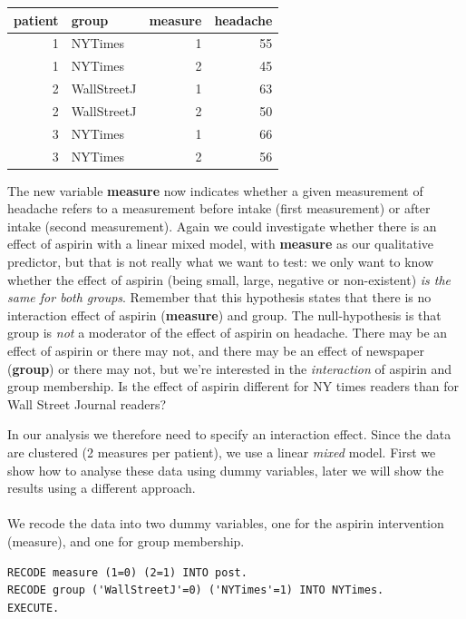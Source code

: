 \documentclass[]{report}\usepackage[]{graphicx}\usepackage[]{color}
\newenvironment{knitrout}{}{} %
\begin{document}
\begin{knitrout}
\color{fgcolor}
\begin{tabular}{r|l|r|r}
\hline
patient & group & measure & headache\\
\hline
1 & NYTimes & 1 & 55\\
\hline
1 & NYTimes & 2 & 45\\
\hline
2 & WallStreetJ & 1 & 63\\
\hline
2 & WallStreetJ & 2 & 50\\
\hline
3 & NYTimes & 1 & 66\\
\hline
3 & NYTimes & 2 & 56\\
\hline
\end{tabular}


\end{knitrout}


The new variable \textbf{measure} now indicates whether a given measurement of headache refers to a measurement before intake (first measurement) or after intake (second measurement). Again we could investigate whether there is an effect of aspirin with a linear mixed model, with \textbf{measure} as our qualitative predictor, but that is not really what we want to test: we only want to know whether the effect of aspirin (being small, large, negative or non-existent) \textit{is the same for both groups}. Remember that this hypothesis states that there is no interaction effect of aspirin (\textbf{measure}) and group. The null-hypothesis is that group is \textit{not} a moderator of the effect of aspirin on headache. There may be an effect of aspirin or there may not, and there may be an effect of newspaper (\textbf{group}) or there may not, but we're interested in the \textit{interaction} of aspirin and group membership. Is the effect of aspirin different for NY times readers than for Wall Street Journal readers?

In our analysis we therefore need to specify an interaction effect. Since the data are clustered (2 measures per patient), we use a linear \textit{mixed} model. First we show how to analyse these data using dummy variables, later we will show the results using a different approach. 
\\
\\
We recode the data into two dummy variables, one for the aspirin intervention (measure), and one for group membership. 

\begin{verbatim}
RECODE measure (1=0) (2=1) INTO post.
RECODE group ('WallStreetJ'=0) ('NYTimes'=1) INTO NYTimes.
EXECUTE.
\end{verbatim}
\end{document}
